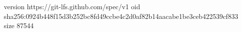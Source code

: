 version https://git-lfs.github.com/spec/v1
oid sha256:0924b448f15d3b252bc8fd49ccbe4c2d0af82b14aacabe1be3ceb422539cf833
size 87544
